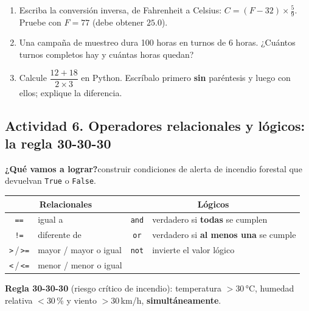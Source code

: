 \documentclass[11pt,a4paper]{article}
\newcommand{\code}[1]{\texttt{#1}}
\newcommand{\actividad}[1]{\begin{objetivo}\textbf{\color{tealProfundo}¿Qué vamos a lograr?}\enspace #1\end{objetivo}}
\begin{document}
\begin{experimente}
\begin{enumerate}[nosep]
  \item Escriba la conversión inversa, de Fahrenheit a Celsius: $C = (F - 32)\times\frac{5}{9}$. Pruebe con $F = 77$ (debe obtener $25.0$).
  \item Una campaña de muestreo dura 100 horas en turnos de 6 horas. ¿Cuántos turnos completos hay y cuántas horas quedan?
  \item Calcule $\dfrac{12 + 18}{2 \times 3}$ en Python. Escríbalo primero \textbf{sin} paréntesis y luego con ellos; explique la diferencia.
\end{enumerate}
\end{experimente}

\subsection{Actividad 6. Operadores relacionales y lógicos: la regla 30-30-30}
\actividad{construir condiciones de alerta de incendio forestal que devuelvan \code{True} o \code{False}.}

\begin{center}
\renewcommand{\arraystretch}{1.25}
\begin{tabular}{c l @{\qquad} c l}
\toprule
\multicolumn{2}{c}{\textbf{Relacionales}} & \multicolumn{2}{c}{\textbf{Lógicos}} \\
\midrule
\code{==} & igual a & \code{and} & verdadero si \textbf{todas} se cumplen \\
\code{!=} & diferente de & \code{or} & verdadero si \textbf{al menos una} se cumple \\
\code{>}\,/\,\code{>=} & mayor / mayor o igual & \code{not} & invierte el valor lógico \\
\code{<}\,/\,\code{<=} & menor / menor o igual & & \\
\bottomrule
\end{tabular}
\end{center}

\textbf{Regla 30-30-30} (riesgo crítico de incendio): temperatura $> 30$\,°C, humedad relativa $< 30$\,\% y viento $> 30$\,km/h, \textbf{simultáneamente}.
\end{document}
